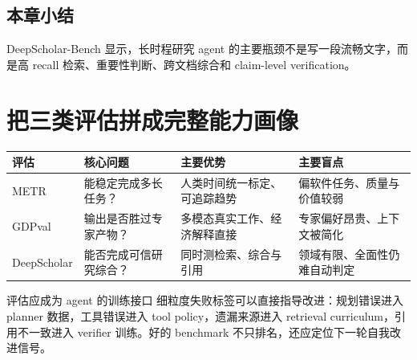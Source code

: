 \documentclass[a4paper]{article}
\begin{document}
\subsection{本章小结}

DeepScholar-Bench 显示，长时程研究 agent 的主要瓶颈不是写一段流畅文字，而是高 recall 检索、重要性判断、跨文档综合和 claim-level verification。

\section{把三类评估拼成完整能力画像}



\begin{table}[H]
\centering
\small
\begin{tabular}{>{\raggedright\arraybackslash}p{2.6cm}>{\raggedright\arraybackslash}p{3.4cm}>{\raggedright\arraybackslash}p{3.8cm}>{\raggedright\arraybackslash}p{3.5cm}}
\toprule
\textbf{评估} & \textbf{核心问题} & \textbf{主要优势} & \textbf{主要盲点} \\
\midrule
METR & 能稳定完成多长任务？ & 人类时间统一标定、可追踪趋势 & 偏软件任务、质量与价值较弱 \\
GDPval & 输出是否胜过专家产物？ & 多模态真实工作、经济解释直接 & 专家偏好昂贵、上下文被简化 \\
DeepScholar & 能否完成可信研究综合？ & 同时测检索、综合与引用 & 领域有限、全面性仍难自动判定 \\
\bottomrule
\end{tabular}
\end{table}



\begin{importantbox}{评估应成为 agent 的训练接口}
细粒度失败标签可以直接指导改进：规划错误进入 planner 数据，工具错误进入 tool policy，遗漏来源进入 retrieval curriculum，引用不一致进入 verifier 训练。好的 benchmark 不只排名，还应定位下一轮自我改进信号。
\end{importantbox}
\end{document}
